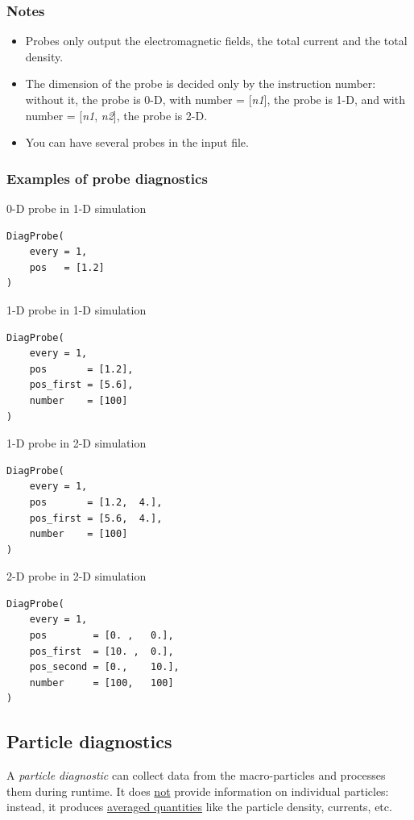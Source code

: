 \documentclass[11pt]{article}
\newcommand{\code}[1]{\colorbox{yellow!15}{\ttfamily #1}}
\newcommand{\val}[1]{{\ttfamily \textit{#1}}}
\begin{document}
\subsubsection*{Notes}
\begin{itemize}
\item Probes only output the electromagnetic fields, the total current and the total density.
\item The dimension of the probe is decided only by the instruction \code{number}: without it, the probe is 0-D, with \code{number = [\val{n1}]}, the probe is 1-D, and with \code{number =  [\val{n1}, \val{n2}]}, the probe is 2-D.
\item You can have several probes in the input file.
\end{itemize}


\subsubsection*{Examples of probe diagnostics}

0-D probe in 1-D simulation
\begin{lstlisting}
DiagProbe(
    every = 1,
    pos   = [1.2]
)
\end{lstlisting}

1-D probe in 1-D simulation
\begin{lstlisting}
DiagProbe(
    every = 1,
    pos       = [1.2],
    pos_first = [5.6],
    number    = [100]
)
\end{lstlisting}

1-D probe in 2-D simulation
\begin{lstlisting}
DiagProbe(
    every = 1,
    pos       = [1.2,  4.],
    pos_first = [5.6,  4.],
    number    = [100]
)
\end{lstlisting}

2-D probe in 2-D simulation
\begin{lstlisting}
DiagProbe(
    every = 1,
    pos        = [0. ,   0.],
    pos_first  = [10. ,  0.],
    pos_second = [0.,    10.],
    number     = [100,   100]
)
\end{lstlisting}



\subsection{Particle diagnostics}

A \textit{particle diagnostic} can collect data from the macro-particles and processes them during runtime.
It does \underline{not} provide information on individual particles: instead, it produces
\underline{averaged quantities} like the particle density, currents, etc.
\end{document}

